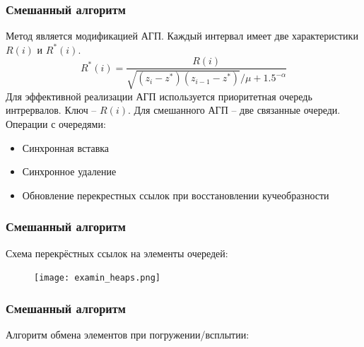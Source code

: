 \documentclass[aspectratio=1610]{beamer}
\begin{document}
\begin{frame}
\frametitle{Смешанный алгоритм}
Метод является модификацией АГП. Каждый интервал имеет две
характеристики \(R(i)\) и \(R^*(i)\).
  \begin{displaymath}
  R^*(i)=\frac{R(i)}{\sqrt{(z_i-z^*)(z_{i-1}-z^*)}/\mu + 1.5^{-\alpha}}
  \end{displaymath}
  Для эффективной реализации АГП используется приоритетная
  очередь интрервалов. Ключ – \(R(i)\).
  Для смешанного АГП – две связанные очереди.
  Операции с очередями:
  \begin{itemize}
    \item Синхронная вставка
    \item Синхронное удаление
    \item Обновление перекрестных ссылок при восстановлении кучеобразности
  \end{itemize}
\end{frame}


\begin{frame}
\frametitle{Смешанный алгоритм}
Схема перекрёстных ссылок на элементы очередей:
    \begin{figure}
      \center
        \texttt{[image: examin\_heaps.png]}
    \end{figure}
\end{frame}

\begin{frame}
\frametitle{Смешанный алгоритм}
Алгоритм обмена элементов при погружении/всплытии:
\lstI
\end{frame}
\end{document}

